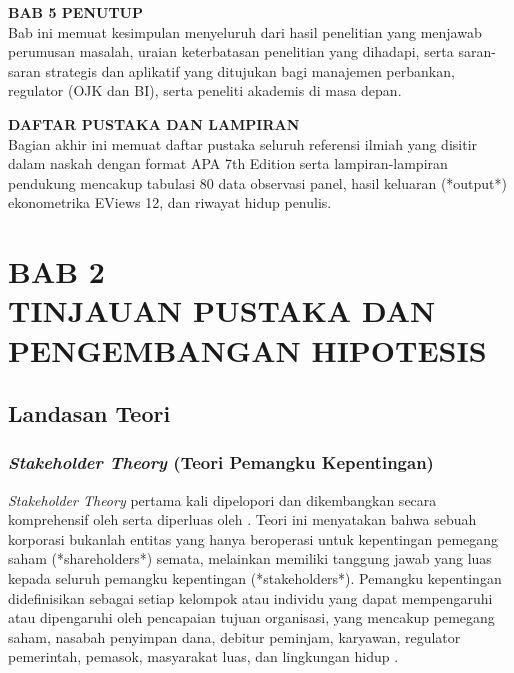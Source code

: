 \documentclass[12pt,a4paper]{article}
\numberwithin{equation}{section}
\begin{document}
\noindent
\textbf{BAB 5 PENUTUP}\\
Bab ini memuat kesimpulan menyeluruh dari hasil penelitian yang menjawab perumusan masalah, uraian keterbatasan penelitian yang dihadapi, serta saran-saran strategis dan aplikatif yang ditujukan bagi manajemen perbankan, regulator (OJK dan BI), serta peneliti akademis di masa depan.

\noindent
\textbf{DAFTAR PUSTAKA DAN LAMPIRAN}\\
Bagian akhir ini memuat daftar pustaka seluruh referensi ilmiah yang disitir dalam naskah dengan format APA 7th Edition serta lampiran-lampiran pendukung mencakup tabulasi 80 data observasi panel, hasil keluaran (*output*) ekonometrika EViews 12, dan riwayat hidup penulis.

\newpage
\setcounter{section}{0}
\section*{BAB 2\\[0.3cm]TINJAUAN PUSTAKA DAN PENGEMBANGAN HIPOTESIS}
\setcounter{section}{2}
\setcounter{subsection}{0}
\setcounter{equation}{0}

\subsection{Landasan Teori}

\subsubsection{\emph{Stakeholder Theory} (Teori Pemangku Kepentingan)}
\noindent
\emph{Stakeholder Theory} pertama kali dipelopori dan dikembangkan secara komprehensif oleh \citet{Freeman2010} serta diperluas oleh \citet{DonaldsonPreston1995}. Teori ini menyatakan bahwa sebuah korporasi bukanlah entitas yang hanya beroperasi untuk kepentingan pemegang saham (*shareholders*) semata, melainkan memiliki tanggung jawab yang luas kepada seluruh pemangku kepentingan (*stakeholders*). Pemangku kepentingan didefinisikan sebagai setiap kelompok atau individu yang dapat mempengaruhi atau dipengaruhi oleh pencapaian tujuan organisasi, yang mencakup pemegang saham, nasabah penyimpan dana, debitur peminjam, karyawan, regulator pemerintah, pemasok, masyarakat luas, dan lingkungan hidup \citep{Freeman2010}.
\end{document}
